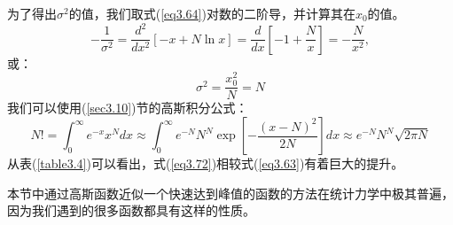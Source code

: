 \documentclass[UTF8]{ctexart}
\numberwithin{equation}{section}%
\numberwithin{figure}{section}%
\begin{document}
    为了得出$\sigma^2$的值，我们取式(\ref{eq3.64})对数的二阶导，并计算其在$x_0$的值。
    \begin{equation}
        -\frac{1}{\sigma^{2}}=\frac{d^{2}}{d x^{2}}[-x+N \ln x]=\frac{d}{d x}\left[-1+\frac{N}{x}\right]=-\frac{N}{x^{2}},
    \end{equation}
    或：
    \begin{equation}
    \sigma^{2}=\frac{x_{0}^{2}}{N}=N
    \end{equation}
    我们可以使用(\ref{sec3.10})节的高斯积分公式：
    \begin{equation}\label{eq3.72}
        N !=\int_{0}^{\infty} e^{-x} x^{N} d x \approx \int_{0}^{\infty} e^{-N} N^{N} \exp \left[-\frac{(x-N)^{2}}{2 N}\right] d x \approx e^{-N} N^{N} \sqrt{2 \pi N}
    \end{equation}
    从表(\ref{table3.4})可以看出，式(\ref{eq3.72})相较式(\ref{eq3.63})有着巨大的提升。
    \begin{mdframed}[backgroundcolor=lightgray,hidealllines=true]
    
        本节中通过高斯函数近似一个快速达到峰值的函数的方法在统计力学中极其普遍，因为我们遇到的很多函数都具有这样的性质。
    \end{mdframed}
\end{document}

